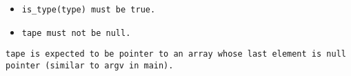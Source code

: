 \begin{itemize}[nosep]

\item \tt{is_type(type)} must be \tt{true}.

\item \tt{tape} must not be null.

\end{itemize}

\note \tt{tape} is expected to be pointer to an array whose
last element is null pointer (similar to \tt{argv} in \tt{main}).
